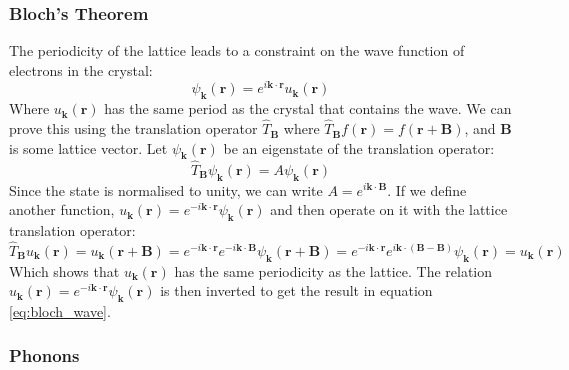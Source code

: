 \documentclass[12pt]{article}
\begin{document}
\subsubsection{Bloch's Theorem}
The periodicity of the lattice leads to a constraint on the wave function of electrons in the crystal:
\begin{equation}\label{eq:bloch_wave}
	\psi_\mathbf k(\mathbf r) = e^{i\mathbf{k}\cdot \mathbf{r}}u_\mathbf k(\mathbf r)
\end{equation}
Where $u_\mathbf k(\mathbf r)$ has the same period as the crystal that contains the wave.
We can prove this using the translation operator $\hat T_\mathbf B$ where $\hat T_\mathbf B f(\mathbf r) = f(\mathbf r + \mathbf B)$, and $\mathbf B$ is some lattice vector. Let $\psi_\mathbf k(\mathbf r)$ be an eigenstate of the translation operator:
\begin{equation}
	\hat T_\mathbf B \psi_\mathbf k(\mathbf r) = A \psi_\mathbf k(\mathbf r)
\end{equation}
Since the state is normalised to unity, we can write $A=e^{i\mathbf k \cdot \mathbf B}$. If we define another function, $u_\mathbf k(\mathbf r) = e^{-i\mathbf k \cdot \mathbf r}\psi_\mathbf k(\mathbf r)$ and then operate on it with the lattice translation operator:
\begin{equation}\label{eq:bloch_proof}
\hat T_\mathbf B u_\mathbf k(\mathbf r) = u_\mathbf k(\mathbf r + \mathbf B) = 
e^{-i\mathbf k \cdot \mathbf r}e^{-i\mathbf k \cdot \mathbf B} \psi_\mathbf k(\mathbf r + \mathbf B) = 
e^{-i\mathbf k \cdot \mathbf r}e^{i\mathbf k \cdot (\mathbf B - \mathbf B)} \psi_\mathbf k(\mathbf r) = u_\mathbf k(\mathbf r)
\end{equation}
Which shows that $u_\mathbf k(\mathbf r)$ has the same periodicity as the lattice. The relation $u_\mathbf k(\mathbf r) = e^{-i \mathbf k \cdot \mathbf r}\psi_\mathbf k(\mathbf r)$ is then inverted to get the result in equation \ref{eq:bloch_wave}.

\subsubsection{Phonons}
\end{document}
